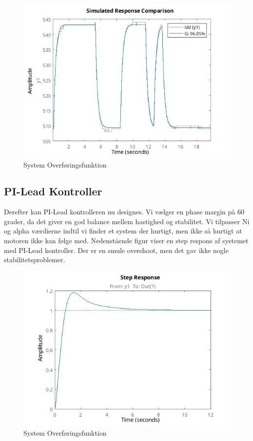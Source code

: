 \documentclass[../main.tex]{subfiles}
\begin{document}
\begin{figure}[H]
      \includegraphics[width=\textwidth]{Dokumentation/Motor Model Fit.jpg}
     \caption{System Overføringsfunktion}
     \label{fig: System Overføringsfunktion}
     \end{figure}

\subsection{PI-Lead Kontroller}
Derefter kan PI-Lead kontrolleren nu designes. Vi vælger en phase margin på 60 grader, da det giver en god balance mellem hastighed og stabilitet. Vi tilpasser Ni og alpha værdierne indtil vi finder et system der hurtigt, men ikke så hurtigt at motoren ikke kan følge med. Nedenstående figur viser en step respons af systemet med PI-Lead kontroller. Der er en smule overshoot, men det gav ikke nogle stabilitetsproblemer.

\begin{figure}[H]
      \includegraphics[width=\textwidth]{Dokumentation/Motor PID Step Response.jpg}
     \caption{System Overføringsfunktion}
     \label{fig: System Overføringsfunktion}
     \end{figure}
\end{document}
